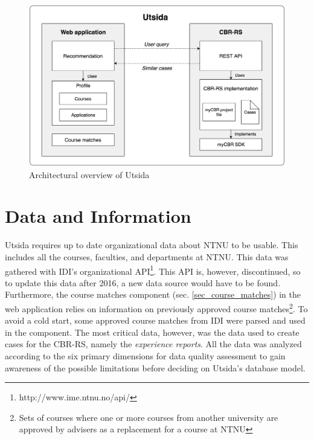 \begin{figure}[H]
    \centering
    \includegraphics[width=1\textwidth]{fig/system_overview.png}
    \caption{Architectural overview of Utsida}
    \label{fig:system_overview}
\end{figure}

\section{Data and Information}

Utsida requires up to date organizational data about NTNU to be usable. This includes all the courses, faculties, and departments at NTNU. This data was gathered with IDI's organizational API\footnote{http://www.ime.ntnu.no/api/}. This API is, however, discontinued, so to update this data after 2016, a new data source would have to be found. Furthermore, the course matches component (sec. \ref{sec_course_matches}) in the web application relies on information on previously approved course matches\footnote{Sets of courses where one or more courses from another university are approved by advisers as a replacement for a course at NTNU}. To avoid a cold start, some approved course matches from IDI were parsed and used in the component. The most critical data, however, was the data used to create cases for the CBR-RS, namely the \textit{experience reports}. All the data was analyzed according to the six primary dimensions for data quality assessment\cite{askham2013six} to gain awareness of the possible limitations before deciding on Utsida's database model.


